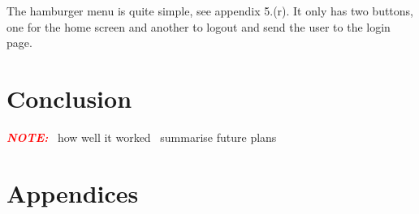 \documentclass{article}
\newcommand{\vspaceconst}{-2ex}
\newcommand{\NOTE}{\textbf{\textit{\textcolor{red}{NOTE:}}} }
\begin{document}
\begin{multicols}{2}
The hamburger menu is quite simple, see appendix 5.(r). It only has two buttons, one for the home screen and another to logout and send the user to the login page.\\


\section{Conclusion}
\vspace{\vspaceconst}
\NOTE~how well it worked
\NTOE~summarise future plans


\newpage
\section*{Appendices}
\vspace{\vspaceconst}


\end{multicols}
\end{document}
